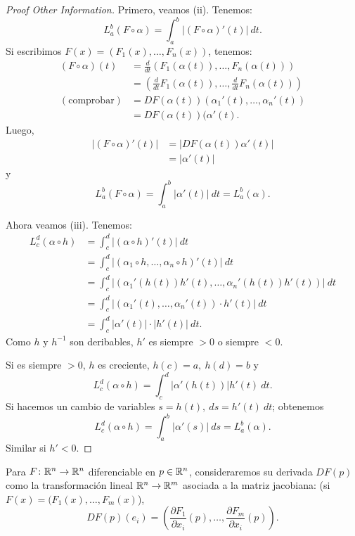\begin{proof}[Proof Other Information]
	Primero, veamos (ii). Tenemos: 
	\[ L_{a}^{b}(F \circ \alpha) = \int_{a}^{b} |(F \circ \alpha)'(t)| \ dt. \]
	Si escribimos $F(x) = (F_{1}(x), \dots, F_{n}(x))$, tenemos:
	\begin{align*}
		(F \circ \alpha)(t) &= \frac{d}{dt}(F_{1}(\alpha(t)), \dots, F_{n}(\alpha(t))) \\
		&= \left( \frac{d}{dt} F_{1}(\alpha(t)), \dots, \frac{d}{dt} F_{n}(\alpha(t)) \right) \\
		(\text{comprobar}) &= DF(\alpha(t))(\alpha_{1}'(t), \dots, \alpha_{n}'(t)) \\
		&= DF(\alpha(t))(\alpha'(t)
	.\end{align*}
	Luego,
	\begin{align*}
		|(F \circ \alpha)'(t)| &= |DF(\alpha(t)) \alpha'(t)| \\
		&= |\alpha'(t)|
	\end{align*}
	y
	\[ L_{a}^{b}(F \circ \alpha) = \int_{a}^{b} |\alpha'(t)| \ dt = L_{a}^{b}(\alpha). \]
	\par
	Ahora veamos (iii). Tenemos:
	\begin{align*}
		L_{c}^{d}(\alpha \circ h) &= \int_{c}^{d} |(\alpha \circ h)'(t)| \ dt \\
		&= \int_{c}^{d} |(\alpha_{1} \circ h, \dots, \alpha_{n} \circ h)'(t)| \ dt \\
		&= \int_{c}^{d} |(\alpha_{1}'(h(t)) h'(t), \dots, \alpha_{n}'(h(t)) h'(t))| \ dt \\
		&= \int_{c}^{d} |(\alpha_{1}'(t), \dots, \alpha_{n}'(t)) \cdot h'(t)| \ dt \\
		&= \int_{c}^{d} |\alpha'(t)| \cdot |h'(t)| \ dt
	.\end{align*}
	Como $h$ y $h^{-1}$ son deribables, $h'$ es siempre $>0$ o siempre $<0$. \par
	Si es siempre $>0$, $h$ es creciente, $h(c) = a,\ h(d) = b$ y
	\[ L_{c}^{d}(\alpha \circ h) = \int_{c}^{d} |\alpha'(h(t))| h'(t) \ dt. \]
	Si hacemos un cambio de variables $s = h(t),\ ds = h'(t) \ dt$; obtenemos
	\[ L_{c}^{d}(\alpha \circ h) = \int_{a}^{b} |\alpha'(s)| \ ds = L_{a}^{b}(\alpha). \]
	Similar si $h' < 0$.
\end{proof}

\begin{observe}
	Para $F \colon \mathbb{R}^{n} \to \mathbb{R}^{n}$ diferenciable en $p \in \mathbb{R}^{n}$, consideraremos su derivada $DF(p)$ como la transformación lineal $\mathbb{R}^{n} \to \mathbb{R}^{m}$ asociada a la matriz jacobiana: (si $F(x) = (F_{1}(x), \dots, F_{m}(x)$),
	\[ DF(p)(e_{i}) = \left( \frac{\partial F_{1}}{\partial x_{i}}(p), \dots, \frac{\partial F_{m}}{\partial x_{i}}(p) \right). \]
\end{observe}

